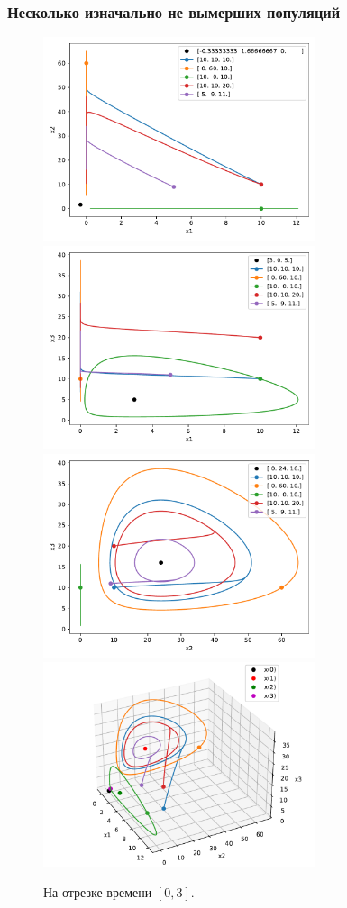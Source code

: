     \subsubsection{Несколько изначально не вымерших популяций}
    \begin{figure}[H]
        \centering
        \includegraphics[width=8cm]{pictures/x_12phase.pdf}
        \includegraphics[width=8cm]{pictures/x_13phase.pdf}
        \includegraphics[width=8cm]{pictures/x_23phase.pdf}
        \includegraphics[width=8cm]{pictures/x_phase3.pdf}
        \caption{На отрезке времени \( [0, 3] \).}
    \end{figure}

